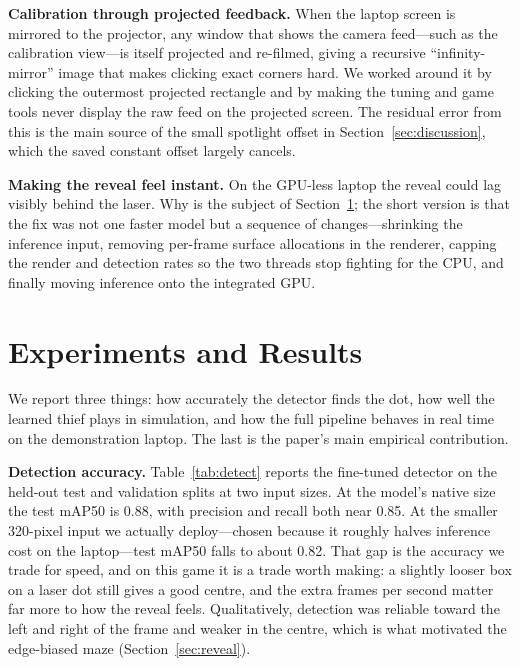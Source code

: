 \documentclass[conference]{IEEEtran}
\begin{document}
\noindent\textbf{Calibration through projected feedback.} When the laptop screen
is mirrored to the projector, any window that shows the camera feed---such as the
calibration view---is itself projected and re-filmed, giving a recursive
``infinity-mirror'' image that makes clicking exact corners hard. We worked around
it by clicking the outermost projected rectangle and by making the tuning and game
tools never display the raw feed on the projected screen. The residual error from
this is the main source of the small spotlight offset in
Section~\ref{sec:discussion}, which the saved constant offset largely cancels.

\noindent\textbf{Making the reveal feel instant.} On the GPU-less laptop the
reveal could lag visibly behind the laser. Why is the subject of
Section~\ref{sec:results}; the short version is that the fix was not one faster
model but a sequence of changes---shrinking the inference input, removing per-frame
surface allocations in the renderer, capping the render and detection rates so the
two threads stop fighting for the CPU, and finally moving inference onto the
integrated GPU.

\section{Experiments and Results}\label{sec:results}
We report three things: how accurately the detector finds the dot, how well the
learned thief plays in simulation, and how the full pipeline behaves in real time
on the demonstration laptop. The last is the paper's main empirical contribution.

\noindent\textbf{Detection accuracy.} Table~\ref{tab:detect} reports the
fine-tuned detector on the held-out test and validation splits at two input sizes.
At the model's native size the test mAP50 is 0.88, with precision and recall both
near 0.85. At the smaller 320-pixel input we actually deploy---chosen because it
roughly halves inference cost on the laptop---test mAP50 falls to about 0.82. That
gap is the accuracy we trade for speed, and on this game it is a trade worth
making: a slightly looser box on a laser dot still gives a good centre, and the
extra frames per second matter far more to how the reveal feels.
Qualitatively, detection was reliable toward the left and right of the frame and
weaker in the centre, which is what motivated the edge-biased maze
(Section~\ref{sec:reveal}).
\end{document}
